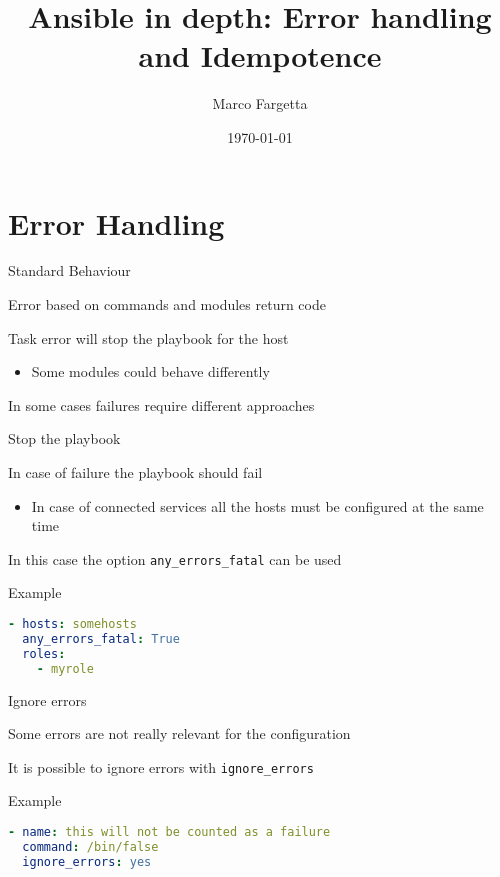 \documentclass[12pt, xcolor={dvipsnames}]{beamer}
\newenvironment{wideitemize}{\itemize\addtolength{\itemsep}{12pt}}{\enditemize}
\begin{document}
\title{Ansible in depth: Error handling and Idempotence}
\author{Marco Fargetta}
\date{\today}

\frame{\titlepage}



\section{Error Handling}
\begin{frame}[t]{Standard Behaviour}
  \begin{wideitemize}
    \item Error based on commands and modules return code
    \item Task error will stop the playbook for the host
    \begin{itemize}
      \item Some modules could behave differently
    \end{itemize}
    \item In some cases failures require different approaches
  \end{wideitemize}
\end{frame}

\begin{frame}[t, fragile]{Stop the playbook}
  \begin{wideitemize}
    \item In case of failure the playbook should fail
    \begin{itemize}
      \item In case of connected services all the hosts must be configured
      at the same time
    \end{itemize}
    \item In this case the option \alert{\texttt{any\_errors\_fatal}} can be used
  \end{wideitemize}
  \begin{block}{Example}
    \begin{lstlisting}[language=yaml]
- hosts: somehosts
  any_errors_fatal: True
  roles:
    - myrole
    \end{lstlisting}
  \end{block}
\end{frame}

\begin{frame}[t, fragile]{Ignore errors}
  \begin{wideitemize}
    \item Some errors are not really relevant for the configuration
    \item It is possible to ignore errors with \alert{\texttt{ignore\_errors}}
  \end{wideitemize}
  \begin{block}{Example}
    \begin{lstlisting}[language=yaml, basicstyle=\scriptsize]
- name: this will not be counted as a failure
  command: /bin/false
  ignore_errors: yes
    \end{lstlisting}
  \end{block}
\end{frame}
\end{document}
